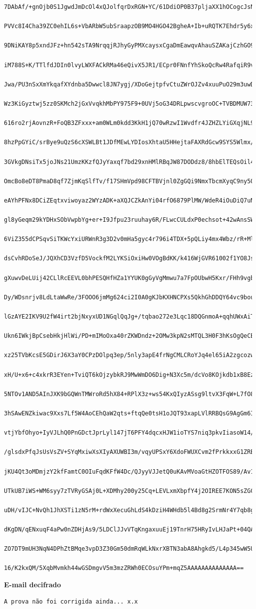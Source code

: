 \documentclass[
    article,            %
    11pt,               %
    oneside,            %
    a4paper,            %
    english,            %
    brazil,             %
    sumario=tradicional,
    ]{abntex2}
\begin{document}
\begin{Verbatim}[frame=single, commandchars=\\\{\}, fontsize=\footnotesize]
    7DAbAf/+gnOjb0S1JgwdJmDcOl4xQJolfqrDxRGN+YC/61DdiOP0B37pljaXX1hOCogcJsNG
    PVVc8I4Cha39ZC0ehIL6s+VbARbW5ubSraapzOB9MO4HGO42BgheA+Ib+uRQTK7Ehdr5y6xJ
    9DNiKAY8p5xndJFz+hn542sTA9NrqqjRJhyGyPMXcaysxCgaDmEawqvAhauSZAKajCzhGO9J
    iM788S+K/TTlfdJDIn0lvyLWXFACkRMa46eQivX5JR1/ECpr0FNnfYhSkoQcRw4RafqiR9vJ
    Jwa/PU3nSxXmYkqafXYdnba5Dwwcl8JN7ygj/XDoGejtpfvCtuZWrOJZv4xuuPuO29m3uwDO
    Wz3KiGyztwj5zz0SKMch2jGxVvqkhMbPY975F9+0UVj5oG34DRLpwscvgroOC+TVBDMUW734
    616ro2rjAovnzR+FoQB3ZFxxx+am0WLm0kdd3KkH1jQ70wRzwI1Wvdfr4JZHZLYiGXqjNL99
    8hzPpGYiC/srBye9uQzS6cXSWLBt1JDfMEwLYDIosXhtaU5HHejtaFAXRdGcw9SYS5Wlmx/7
    3GVkgDNsiTx5joJNs21UmzKKzfQJyYaxqf7bd29xnHMlRBqJW87DODdz8/8hbElTEQsOil4V
    OmcBo8eDT8PmaD8qf7ZjmKqSlfTv/f17SHmVpd98CFTBVjnl0ZgGQi9NmxTbcmXyqC9ny5O0
    eAYhPFNx8DCiZEqtxviwoyaz2WYzADK+aXQJCZkAnYi04rfO6879PlMW/WdeR4iOuDiQ7uNf
    gl8yGeqm29kYDHxSObVwpbYg+er+I9Jfpu23ruuhay6R/FLwcCULdxP0echsot+42wAnsSWa
    6ViZ355dCPSqvSiTKWcYxiURWnR3g3D2v0mHa5gyc4r796i4TDX+5pQLiy4mx4Wbz/rR+Ml5
    dsCvhRDoSeJ/JQXhCD3VzfD5VockfM2LYKSiOxiHw0VOgBdKK/k416WjGVR61002f1YO8Js8
    gXuwvDeLUij42CLlRcEEVL0bhPESQHfHZa1YYUK0gGyVgMmwu7a7FpOUbwH5Kxr/FHh9vgbw
    Dy/WDsnrjv8LdLtaWwRe/3FOOO6jmMg624ci2I0A0gKJbKXHNCPXs5QkhGhDDQY64vc9bour
    lGzAYE2IKV9U2fW4irt2bjNxyxUD1NGqlQqJg+/tqbao272e3Lqc18DQGnmoA+qqhUWxAiTO
    Ukn6IWkjBpCsebHkjHlWi/PD+mIMoOxa40rZKWDndz+2OMw3kpN2sMTQL3H0F3hKsOgQeCB5
    xz25TVbKcsE5GDirJ6X3aY0CPzDOlpq3ep/5nly3apE4frNgCMLCRoYJq4el65iA2zgcozwD
    xH/U+x6+c4xkrR3EYen+TviQT6kOjzybkRJ9MwWmDO6Dig+N3Xc5m/dcVo8KOjkdb1xB8EzX
    5NTOv1AND5AInJXK9bGQWnTMWroRd5hX84+RPlX3z+ws54KxQIyzASsg9ltvX3FqW+L7fO8h
    3hSAwENZkiwac9Xxs7Lf5W4AoCEhQaW2qts+ftqQe0tsH1oJQT93xapLVlRRBQsG9AgGm6If
    vtjYbfOhyo+IyVJLhQ0PnGDctJprLyl147jT6PFY4dqcxHJW1ioTYS7niq3pkvIiasoW14/2
    /glsdxPfqJsUsVsZV+SYqMxiwXsXIyAXUWBI3m/vqyUPSxY6XdoFWUXCvm2fPrkkxxG1ZRBE
    jKU4Qt3oMDmjzY2kfFamtC0OIuFqdKFfW4Dc/QJyyVJJetQ0uKAvMVoaGtHZOTFOS89/Av1J
    UTkUB7iWS+WM6syy7zTVRyGSAj0L+XDMhy200y25Cq+LEVLxmXbpfY4j2OIREE7KON5sZGCR
    uDH/vIJC+NvQh1JhXSTi1zN5rM+rdWxXecuGhLdS4kDziH4WHdb5l4Bd8g2SrmNr4Y7qb8ge
    dKgDN/qENxuqF4aPw0nZDHjAs9/5LDClJJvVTqKngaxuuEj19TnrH75HRyIvLHJaPt+04QAI
    ZO7DT9mUH3NqN4DPhZtBMqe3vpD3Z30Gm50dmRqWLkNxrXBTN3abA8Ahgkd5/L4p345wW5U4
    16/K2kxQM/5XqbMvmkh44wGSDmgvV5m3mzZRWh0ECOsuYPm+mqZ5AAAAAAAAAAAAAA==
\end{Verbatim}

\newpage
\textbf{E-mail decifrado}
    \begin{Verbatim}[frame=single, commandchars=\\\{\}, fontsize=\footnotesize]
                            A prova não foi corrigida ainda... x.x
    \end{Verbatim}
% 
\end{document}
